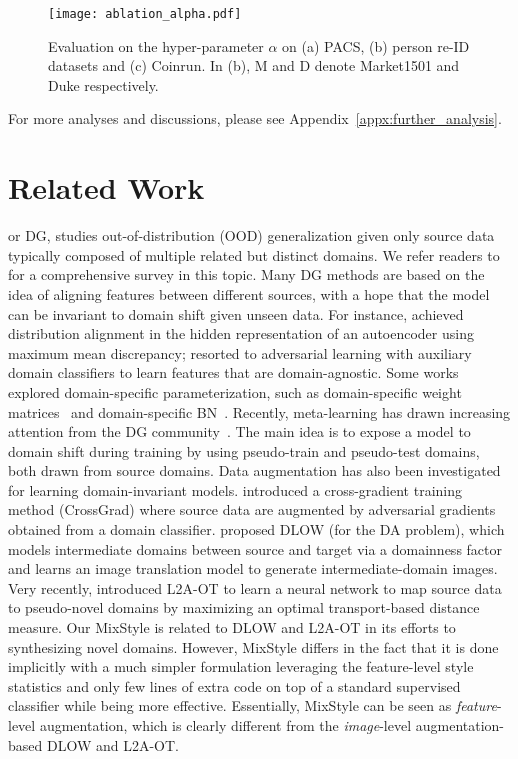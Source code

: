 \documentclass{article} \usepackage{iclr2021_conference,times}
\makeatletter
\renewcommand\paragraph{\@startsection{paragraph}{4}{\z@}{.1em \@plus1ex \@minus.2ex}{-.5em}{\normalfont\normalsize\bfseries}}
\makeatother
\begin{document}
\begin{figure}[t]
    \centering
    \texttt{[image: ablation\_alpha.pdf]}
    \caption{Evaluation on the hyper-parameter $\alpha$ on (a) PACS, (b) person re-ID datasets and (c) Coinrun. In (b), M and D denote Market1501 and Duke respectively.}
    \label{fig:ablation_alpha}
\end{figure}

For more analyses and discussions, please see Appendix~\ref{appx:further_analysis}.


\section{Related Work}
\paragraph{Domain generalization,}
or DG, studies out-of-distribution (OOD) generalization given only source data typically composed of multiple related but distinct domains. We refer readers to~\citet{zhou2021domain} for a comprehensive survey in this topic. Many DG methods are based on the idea of aligning features between different sources, with a hope that the model can be invariant to domain shift given unseen data. For instance, \citet{li2018mmdaae} achieved distribution alignment in the hidden representation of an autoencoder using maximum mean discrepancy; \citet{li2018ciddg} resorted to adversarial learning with auxiliary domain classifiers to learn features that are domain-agnostic. Some works explored domain-specific parameterization, such as domain-specific weight matrices~\citep{li2017deeper} and domain-specific BN~\citep{seo2020learning}. Recently, meta-learning has drawn increasing attention from the DG community~\citep{li2018learning,balaji2018metareg,dou2019domain}. The main idea is to expose a model to domain shift during training by using pseudo-train and pseudo-test domains, both drawn from source domains. Data augmentation has also been investigated for learning domain-invariant models. \citet{shankar2018generalizing} introduced a cross-gradient training method (CrossGrad) where source data are augmented by adversarial gradients obtained from a domain classifier. \citet{gong2018dlow} proposed DLOW (for the DA problem), which models intermediate domains between source and target via a domainness factor and learns an image translation model to generate intermediate-domain images. Very recently, \citet{zhou2020learning} introduced L2A-OT to learn a neural network to map source data to pseudo-novel domains by maximizing an optimal transport-based distance measure. Our MixStyle is related to DLOW and L2A-OT in its efforts to synthesizing novel domains. However, MixStyle differs in the fact that it is done implicitly with a much simpler formulation leveraging the feature-level style statistics and only few lines of extra code on top of a standard supervised classifier while being more effective. Essentially, MixStyle can be seen as \emph{feature}-level augmentation, which is clearly different from the \emph{image}-level augmentation-based DLOW and L2A-OT.
\end{document}
